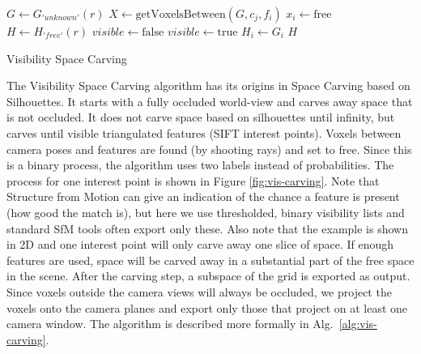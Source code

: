 {\singlespacing
\begin{algorithm}[!h]
  \centering
  \begin{algorithmic}[1]
     
      \State $G \gets G_{'unknown'}(r)$ 
         
          \State $X \gets \mathrm{getVoxelsBetween}(G, c_j, f_i)$ 
            \State $x_i \gets \mathrm{\textrm{free}}$ 
          \EndFor
        \EndFor
      \EndFor
      \State $H \gets H_{'free'}(r)$ 
        \State $visible \gets \mathrm{false}$
            \State $visible \gets \mathrm{true}$
          \EndIf
        \EndFor
          \State $H_i \gets G_i$ 
        \EndIf
      \EndFor
      \State \Return $H$
    \EndFunction
  \end{algorithmic}
  \caption{Visibility Space Carving}
  \label{alg:vis-carving}
\end{algorithm}
}

The Visibility Space Carving algorithm has its origins in Space Carving based on Silhouettes. It starts with a fully occluded world-view and carves away space that is not occluded. It does not carve space based on silhouettes until infinity, but carves until visible triangulated features (\ie SIFT interest points). Voxels between camera poses and features are found (\ie by shooting rays) and set to free. Since this is a binary process, the algorithm uses two labels instead of probabilities. The process for one interest point is shown in Figure \ref{fig:vis-carving}. Note that Structure from Motion can give an indication of the chance a feature is present (\ie how good the match is), but here we use thresholded, binary visibility lists and standard SfM tools often export only these. Also note that the example is shown in 2D and one interest point will only carve away one slice of space. If enough features are used, space will be carved away in a substantial part of the free space in the scene. After the carving step, a subspace of the grid is exported as output. Since voxels outside the camera views will always be occluded, we project the voxels onto the camera planes and export only those that project on at least one camera window. The algorithm is described more formally in Alg.~\ref{alg:vis-carving}.

